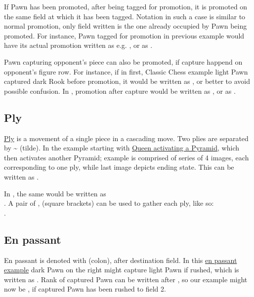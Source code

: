 If Pawn has been promoted, after being tagged for promotion, it is promoted on the same
field at which it has been tagged. Notation in such a case is similar to normal promotion,
only field written is the one already occupied by Pawn being promoted. For instance, Pawn
tagged for promotion in previous example would have its actual promotion written as e.g.
, or as .

Pawn capturing opponent's piece can also be promoted, if capture happend on opponent's
figure row. For instance, if in first, Classic Chess example light Pawn captured dark
Rook before promotion, it would be written as , or better  to
avoid possible confusion. In , promotion after capture would be written as
, or as .

\subsection*{Ply}
\label{sec:Appendix/Notation/Ply}

\hyperref[sec:Terms/Ply]{Ply} is a movement of a single piece in a cascading move. Two plies
are separated by \~{} (tilde). In the example starting with
\hyperref[fig:scn_ma_15_cascading_init]{Queen activating a Pyramid}, which then activates
another Pyramid; example is comprised of series of 4 images, each corresponding to one ply,
while last image depicts ending state. This can be written as .

In , the same would be written as \\
. A pair of \alg{[}, \alg{]} (square brackets) can be used
to gather each ply, like so: \\
\alg{[Qk2-f7]\~{}[Af7-i7]\~{}[Ai7-i9]}.

\subsection*{En passant}
\label{sec:Appendix/Notation/En passant}

En passant is denoted with \alg{:} (colon), after destination field. In this
\hyperref[fig:04_croatian_ties_en_passant]{en passant example} dark Pawn on the right might
capture light Pawn if rushed, which is written as . Rank of captured Pawn can be
written after \alg{:}, so our example might now be , if captured Pawn has been
rushed to field 2.

